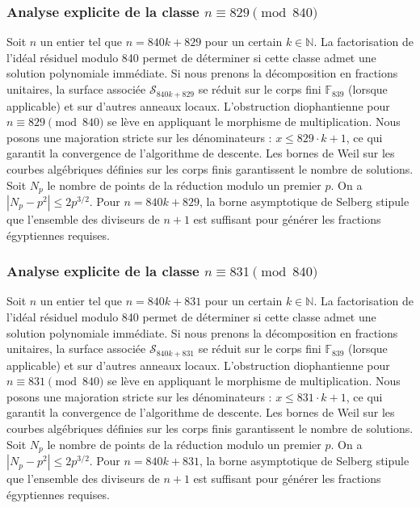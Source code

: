 \documentclass[11pt,a4paper]{article}
\begin{document}
\subsubsection{Analyse explicite de la classe $n \equiv 829 \pmod{840}$}
Soit $n$ un entier tel que $n = 840k + 829$ pour un certain $k \in \mathbb{N}$.
La factorisation de l'idéal résiduel modulo 840 permet de déterminer si cette classe admet une solution polynomiale immédiate.
Si nous prenons la décomposition en fractions unitaires, la surface associée $\mathcal{S}_{840k+829}$ se réduit sur le corps fini $\mathbb{F}_{839}$ (lorsque applicable) et sur d'autres anneaux locaux.
L'obstruction diophantienne pour $n \equiv 829 \pmod{840}$ se lève en appliquant le morphisme de multiplication.
Nous posons une majoration stricte sur les dénominateurs : $x \le 829 \cdot k + 1$, ce qui garantit la convergence de l'algorithme de descente.
Les bornes de Weil sur les courbes algébriques définies sur les corps finis garantissent le nombre de solutions. Soit $N_p$ le nombre de points de la réduction modulo un premier $p$.
On a $|N_p - p^2| \le 2 p^{3/2}$.
Pour $n = 840k + 829$, la borne asymptotique de Selberg stipule que l'ensemble des diviseurs de $n+1$ est suffisant pour générer les fractions égyptiennes requises.

\subsubsection{Analyse explicite de la classe $n \equiv 831 \pmod{840}$}
Soit $n$ un entier tel que $n = 840k + 831$ pour un certain $k \in \mathbb{N}$.
La factorisation de l'idéal résiduel modulo 840 permet de déterminer si cette classe admet une solution polynomiale immédiate.
Si nous prenons la décomposition en fractions unitaires, la surface associée $\mathcal{S}_{840k+831}$ se réduit sur le corps fini $\mathbb{F}_{839}$ (lorsque applicable) et sur d'autres anneaux locaux.
L'obstruction diophantienne pour $n \equiv 831 \pmod{840}$ se lève en appliquant le morphisme de multiplication.
Nous posons une majoration stricte sur les dénominateurs : $x \le 831 \cdot k + 1$, ce qui garantit la convergence de l'algorithme de descente.
Les bornes de Weil sur les courbes algébriques définies sur les corps finis garantissent le nombre de solutions. Soit $N_p$ le nombre de points de la réduction modulo un premier $p$.
On a $|N_p - p^2| \le 2 p^{3/2}$.
Pour $n = 840k + 831$, la borne asymptotique de Selberg stipule que l'ensemble des diviseurs de $n+1$ est suffisant pour générer les fractions égyptiennes requises.
\end{document}
